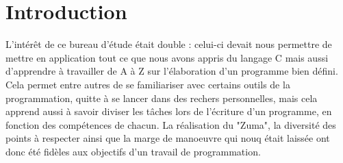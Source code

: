 \section{Introduction}
L'intérêt de ce bureau d'étude était double : celui-ci devait nous permettre de mettre en application
tout ce que nous avons appris du langage C mais aussi d'apprendre à travailler de A à Z sur l'élaboration
d'un programme bien défini. Cela permet entre autres de se familiariser avec certains outils de la programmation, quitte
à se lancer dans des rechers personnelles, mais cela apprend aussi à savoir diviser les tâches lors de l'écriture
d'un programme, en fonction des compétences de chacun.
La réalisation du "Zuma", la diversité des points à respecter ainsi que la marge de manoeuvre qui nouq était laissée ont donc été fidèles aux objectifs d'un travail de programmation.   

